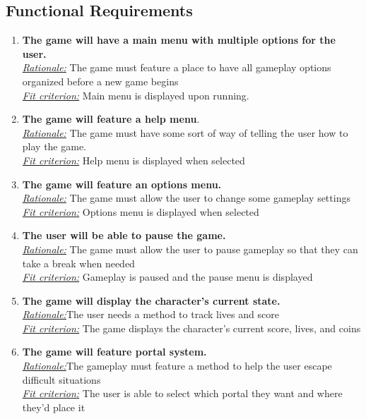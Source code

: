 \documentclass[12pt, titlepage]{article}
\begin{document}
\subsection{Functional Requirements}
\begin{enumerate}
\item \textbf{The game will have a main menu with multiple options for the user.} \\
\underline{\textit{Rationale:}}  The game must feature a place to have all gameplay options organized before a new game begins\\
\underline{\textit{Fit criterion:}} Main menu is displayed upon running.\\

\item \textbf{The game will feature a help menu}.\\
\underline{\textit{Rationale:}} The game must have some sort of way of telling the user how to play the game.\\
\underline{\textit{Fit criterion:}} Help menu is displayed when selected\\

\item \textbf{The game will feature an options menu.}\\
\underline{\textit{Rationale:}} The game must allow the user to change some gameplay settings\\
\underline{\textit{Fit criterion:}} Options menu is displayed when selected\\

\item \textbf{The user will be able to pause the game.}\\
\underline{\textit{Rationale:}} The game must allow the user to pause gameplay so that they can take a break when needed\\
\underline{\textit{Fit criterion:}} Gameplay is paused and the pause menu is displayed\\

\item \textbf{The game will display the character's current state.}\\
\underline{\textit{Rationale:}}The user needs a method to track lives and score\\
\underline{\textit{Fit criterion:}} The game displays the character's current score, lives, and coins\\

\item \textbf{The game will feature portal system.}\\
\underline{\textit{Rationale:}}The gameplay must feature a method to help the user escape difficult situations\\
\underline{\textit{Fit criterion:}} The user is able to select which portal they want and where they'd place it\\


\end{enumerate}
\end{document}
